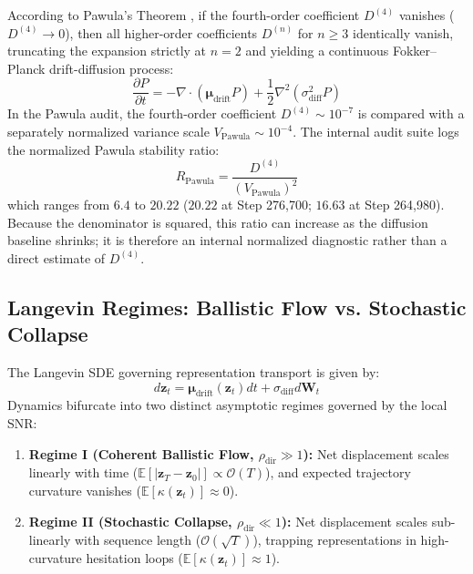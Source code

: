 \documentclass[11pt]{article}
\begin{document}
According to Pawula's Theorem \cite{pawula1967, amari2016information}, if the fourth-order coefficient $D^{(4)}$ vanishes ($D^{(4)} \to 0$), then all higher-order coefficients $D^{(n)}$ for $n \ge 3$ identically vanish, truncating the expansion strictly at $n=2$ and yielding a continuous Fokker--Planck drift-diffusion process:
\begin{equation}
\frac{\partial P}{\partial t} = -\nabla \cdot \left( \boldsymbol{\mu}_{\text{drift}} P \right) + \frac{1}{2} \nabla^2 \left( \sigma^2_{\text{diff}} P \right)
\end{equation}
In the Pawula audit, the fourth-order coefficient $D^{(4)} \sim 10^{-7}$ is compared with a separately normalized variance scale $V_{\mathrm{Pawula}} \sim 10^{-4}$. The internal audit suite logs the normalized Pawula stability ratio:
\begin{equation}
R_{\text{Pawula}} = \frac{D^{(4)}}{\left(V_{\mathrm{Pawula}}\right)^2}
\end{equation}
which ranges from $6.4$ to $20.22$ ($20.22$ at Step 276,700; $16.63$ at Step 264,980). Because the denominator is squared, this ratio can increase as the diffusion baseline shrinks; it is therefore an internal normalized diagnostic rather than a direct estimate of $D^{(4)}$.

\subsection{Langevin Regimes: Ballistic Flow vs. Stochastic Collapse}
The Langevin SDE governing representation transport is given by:
\begin{equation}
d\mathbf{z}_t = \boldsymbol{\mu}_{\text{drift}}(\mathbf{z}_t) dt + \sigma_{\text{diff}} d\mathbf{W}_t
\end{equation}
Dynamics bifurcate into two distinct asymptotic regimes governed by the local SNR:
\begin{enumerate}
    \item \textbf{Regime I (Coherent Ballistic Flow, $\rho_{\text{dir}} \gg 1$):} Net displacement scales linearly with time ($\mathbb{E}[|\mathbf{z}_T - \mathbf{z}_0|] \propto \mathcal{O}(T)$), and expected trajectory curvature vanishes ($\mathbb{E}[\kappa(\mathbf{z}_t)] \approx 0$).
    \item \textbf{Regime II (Stochastic Collapse, $\rho_{\text{dir}} \ll 1$):} Net displacement scales sub-linearly with sequence length ($\mathcal{O}(\sqrt{T})$), trapping representations in high-curvature hesitation loops ($\mathbb{E}[\kappa(\mathbf{z}_t)] \approx 1$).
\end{enumerate}
\end{document}
